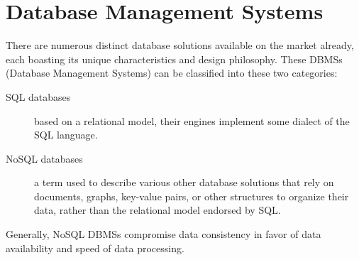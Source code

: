 \chapter{Database Management Systems}
\label{ch:background}
\par There are numerous distinct database solutions available on the market already, each boasting its unique characteristics and design philosophy. These DBMSs (Database Management Systems) can be classified into these two categories:
\begin{description}
  \item[SQL databases] based on a relational model, their engines implement some dialect of the SQL language.
  \item[NoSQL databases] a term used to describe various other database solutions that rely on documents, graphs, key-value pairs, or other structures to organize their data, rather than the relational model endorsed by SQL\citep{SQLvNOSQL}.
\end{description}

\par Generally, NoSQL DBMSs compromise data consistency in favor of data availability and speed of data processing.

